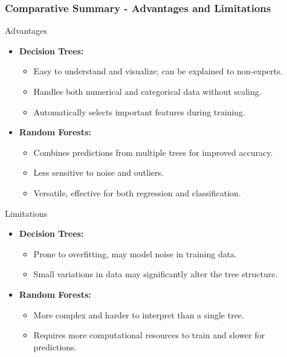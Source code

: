 \documentclass[aspectratio=169]{beamer}
\begin{document}
\begin{frame}[fragile]
    \frametitle{Comparative Summary - Advantages and Limitations}
    \begin{block}{Advantages}
        \begin{itemize}
            \item \textbf{Decision Trees:}
            \begin{itemize}
                \item Easy to understand and visualize; can be explained to non-experts.
                \item Handles both numerical and categorical data without scaling.
                \item Automatically selects important features during training.
            \end{itemize}
            \item \textbf{Random Forests:}
            \begin{itemize}
                \item Combines predictions from multiple trees for improved accuracy.
                \item Less sensitive to noise and outliers.
                \item Versatile, effective for both regression and classification.
            \end{itemize}
        \end{itemize}
    \end{block}
    \begin{block}{Limitations}
        \begin{itemize}
            \item \textbf{Decision Trees:}
            \begin{itemize}
                \item Prone to overfitting, may model noise in training data.
                \item Small variations in data may significantly alter the tree structure.
            \end{itemize}
            \item \textbf{Random Forests:}
            \begin{itemize}
                \item More complex and harder to interpret than a single tree.
                \item Requires more computational resources to train and slower for predictions.
            \end{itemize}
        \end{itemize}
    \end{block}
\end{frame}
\end{document}
